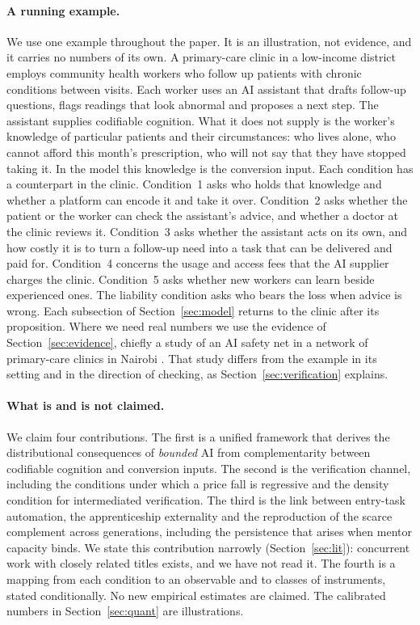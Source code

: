 \documentclass[12pt]{article}
\theoremstyle{remark}
\begin{document}
\paragraph{A running example.} We use one example throughout the paper. It is an illustration, not evidence, and it carries no numbers of its own. A primary-care clinic in a low-income district employs community health workers who follow up patients with chronic conditions between visits. Each worker uses an AI assistant that drafts follow-up questions, flags readings that look abnormal and proposes a next step. The assistant supplies codifiable cognition. What it does not supply is the worker's knowledge of particular patients and their circumstances: who lives alone, who cannot afford this month's prescription, who will not say that they have stopped taking it. In the model this knowledge is the conversion input. Each condition has a counterpart in the clinic. Condition~1 asks who holds that knowledge and whether a platform can encode it and take it over. Condition~2 asks whether the patient or the worker can check the assistant's advice, and whether a doctor at the clinic reviews it. Condition~3 asks whether the assistant acts on its own, and how costly it is to turn a follow-up need into a task that can be delivered and paid for. Condition~4 concerns the usage and access fees that the AI supplier charges the clinic. Condition~5 asks whether new workers can learn beside experienced ones. The liability condition asks who bears the loss when advice is wrong. Each subsection of Section~\ref{sec:model} returns to the clinic after its proposition. Where we need real numbers we use the evidence of Section~\ref{sec:evidence}, chiefly a study of an AI safety net in a network of primary-care clinics in Nairobi \citep[p.~1]{korom2025penda}. That study differs from the example in its setting and in the direction of checking, as Section~\ref{sec:verification} explains.

\paragraph{What is and is not claimed.} We claim four contributions. The first is a unified framework that derives the distributional consequences of \emph{bounded} AI from complementarity between codifiable cognition and conversion inputs. The second is the verification channel, including the conditions under which a price fall is regressive and the density condition for intermediated verification. The third is the link between entry-task automation, the apprenticeship externality and the reproduction of the scarce complement across generations, including the persistence that arises when mentor capacity binds. We state this contribution narrowly (Section~\ref{sec:lit}): concurrent work with closely related titles exists, and we have not read it. The fourth is a mapping from each condition to an observable and to classes of instruments, stated conditionally. No new empirical estimates are claimed. The calibrated numbers in Section~\ref{sec:quant} are illustrations.
\end{document}
